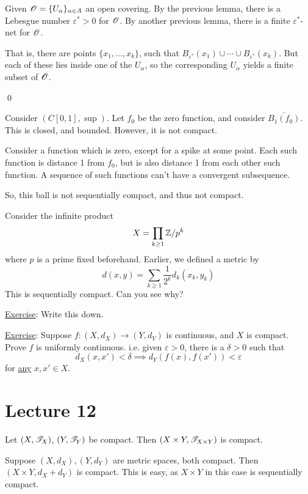 \documentclass[x11names,reqno,14pt]{extarticle}
\begin{document}
Given $\mathscr{O} = \{U_\alpha\}_{\alpha\in A}$ an open covering. By the previous lemma, there is a Lebesgue number $\varepsilon^* > 0$ for $\mathscr{O}$. By another previous lemma, there is a finite $\varepsilon^*$-net for $\mathscr{O}$. 

That is, there are points $\{x_1, \dots, x_k\}$, such that $B_{\varepsilon^*}(x_1) \cup \cdots \cup B_{\varepsilon^*}(x_k)$. But each of these lies inside one of the $U_\alpha$, so the corresponding $U_\alpha$ yields a finite subset of $\mathscr{O}$. 

\qed

\exm

Consider $(C[0, 1], \sup)$. Let $f_0$ be the zero function, and consider $\bar{B_1(f_0)}$. This is closed, and bounded. However, it is not compact. 

Consider a function which is zero, except for a spike at some point. Each such function is distance 1 from $f_0$, but is also distance 1 from each other such function. A sequence of such functions can't have a convergent subsequence. 

So, this ball is not sequentially compact, and thus not compact. 

\exm

Consider the infinite product
\[
X = \prod_{k\geq1}\mathbb{Z}/p^k
\]
where $p$ is a prime fixed beforehand. Earlier, we defined a metric by
\[
d(x, y) = \sum_{k\geq1}\frac{1}{2^k}d_k(x_k, y_k)
\]
This is sequentially compact. Can you see why?

\underline{Exercise}: Write this down. 

\underline{Exercise}: Suppose $f:(X, d_X) \to (Y,d_Y)$ is continuous, and $X$ is compact. Prove $f$ is uniformly continuous. i.e. given $\varepsilon>0$, there is a $\delta>0$ such that
\[
d_X(x, x') < \delta \implies d_Y(f(x), f(x')) < \varepsilon
\]
for \underline{any} $x, x' \in X$. 

\section*{Lecture 12}

\thm

Let $(X, \mathscr{T}_X)$, $(Y, \mathscr{T}_Y)$ be compact. Then $(X\times Y, \mathscr{T}_{X\times Y})$ is compact. 

\rem

Suppose $(X, d_X), (Y, d_Y)$ are metric spaces, both compact. Then $(X\times Y, d_X + d_Y)$ is compact. This is easy, as $X\times Y$ in this case is sequentially compact. 
\end{document}
